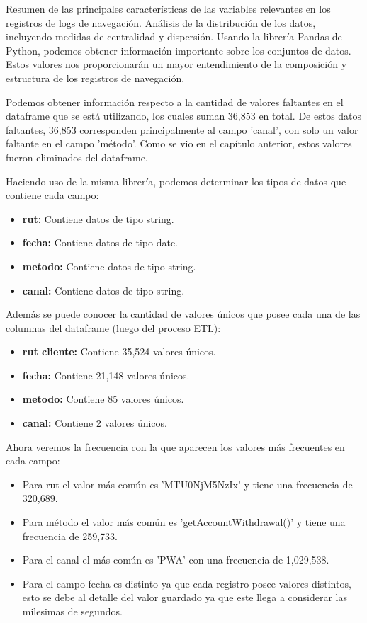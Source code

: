 Resumen de las principales características de las variables relevantes en los registros de logs de navegación. Análisis de la distribución de los datos, incluyendo medidas de centralidad y dispersión. Usando la librería Pandas de Python, podemos obtener información importante sobre los conjuntos de datos. Estos valores nos proporcionarán un mayor entendimiento de la composición y estructura de los registros de navegación.

Podemos obtener información respecto a la cantidad de valores faltantes en el dataframe que se está utilizando, los cuales suman 36,853 en total. De estos datos faltantes, 36,853 corresponden principalmente al campo 'canal', con solo un valor faltante en el campo 'método'. Como se vio en el capítulo anterior, estos valores fueron eliminados del dataframe.

Haciendo uso de la misma librería, podemos determinar los tipos de datos que contiene cada campo:

\begin{itemize}
    \item \textbf{rut:} Contiene datos de tipo string.
    \item \textbf{fecha:} Contiene datos de tipo date.
    \item \textbf{metodo:} Contiene datos de tipo string.
    \item \textbf{canal:} Contiene datos de tipo string.
\end{itemize}

Además se puede conocer la cantidad de valores únicos que posee cada una de las columnas del dataframe (luego del proceso ETL):

\begin{itemize}
    \item \textbf{rut cliente:} Contiene 35,524 valores únicos.
    \item \textbf{fecha:} Contiene 21,148 valores únicos.
    \item \textbf{metodo:} Contiene 85 valores únicos.
    \item \textbf{canal:} Contiene 2 valores únicos.
\end{itemize}

Ahora veremos la frecuencia con la que aparecen los valores más frecuentes en cada campo:
\begin{itemize}
    \item Para rut el valor más común es 'MTU0NjM5NzIx' y tiene una frecuencia de 320,689.
    \item Para método el valor más común es 'getAccountWithdrawal()' y tiene una frecuencia de 259,733.
    \item Para el canal el más común es 'PWA' con una frecuencia de 1,029,538.
    \item Para el campo fecha es distinto ya que cada registro posee valores distintos, esto se debe al detalle del valor guardado ya que este llega a considerar las milesimas de segundos.
\end{itemize}

